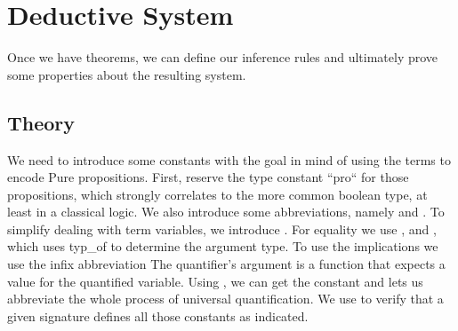 \chapter{Deductive System}\label{chapter:predicate}

Once we have theorems, we can define our inference rules and ultimately prove some properties about the resulting system.

\section{Theory}

We need to introduce some constants with the goal in mind of using the terms to encode Pure propositions.
First, reserve the type constant ``pro`` for those propositions, which strongly correlates to the more common boolean type, at least in a classical logic.
We also introduce some abbreviations, namely  and .
To simplify dealing with term variables, we introduce .
For equality we  use , and , which uses typ\_of to determine the argument type.
To use the implications we use the infix abbreviation 
The quantifier's argument is a function that expects a value for the quantified variable.
Using , we can get the constant and  lets us abbreviate the whole process of universal quantification.
We use  to verify that a given signature defines all those constants as indicated.

